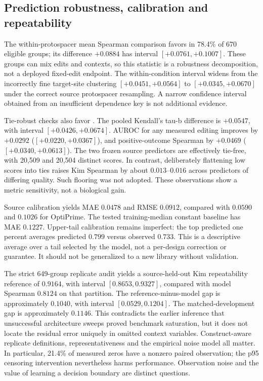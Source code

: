 \subsection{Prediction robustness, calibration and repeatability}\label{sec:suprobust}
The within-protospacer mean Spearman comparison favors \model{} in 78.4\% of 670 eligible groups; its difference $+0.0884$ has interval $[+0.0761,+0.1007]$. These groups can mix edits and contexts, so this statistic is a robustness decomposition, not a deployed fixed-edit endpoint. The within-condition interval widens from the incorrectly fine target-site clustering $[+0.0451,+0.0564]$ to $[+0.0345,+0.0670]$ under the correct source protospacer resampling. A narrow confidence interval obtained from an insufficient dependence key is not additional evidence.

Tie-robust checks also favor \model{}. The pooled Kendall's tau-b difference is $+0.0547$, with interval $[+0.0426,+0.0674]$. AUROC for any measured editing improves by $+0.0292$ ($[+0.0220,+0.0367]$), and positive-outcome Spearman by $+0.0469$ ($[+0.0340,+0.0613]$). The two frozen source predictors are effectively tie-free, with 20,509 and 20,504 distinct scores. In contrast, deliberately flattening low scores into ties raises Kim Spearman by about $0.013$--$0.016$ across predictors of differing quality. Such flooring was not adopted. These observations show a metric sensitivity, not a biological gain.

Source calibration yields MAE $0.0478$ and RMSE $0.0912$, compared with $0.0590$ and $0.1026$ for OptiPrime. The tested training-median constant baseline has MAE $0.1227$. Upper-tail calibration remains imperfect: the top predicted one percent averages predicted $0.799$ versus observed $0.733$. This is a descriptive average over a tail selected by the model, not a per-design correction or guarantee. It should not be generalized to a new library without validation.

The strict 649-group replicate audit yields a source-held-out Kim repeatability reference of $0.9164$, with interval $[0.8653,0.9327]$, compared with model Spearman $0.8124$ on that partition. The reference-minus-model gap is approximately $0.1040$, with interval $[0.0529,0.1204]$. The matched-development gap is approximately $0.1146$. This contradicts the earlier inference that unsuccessful architecture sweeps proved benchmark saturation, but it does not locate the residual error uniquely in omitted context variables. Construct-aware replicate definitions, representativeness and the empirical noise model all matter. In particular, 21.4\% of measured zeros have a nonzero paired observation; the p95 censoring intervention nevertheless harms performance. Observation noise and the value of learning a decision boundary are distinct questions.

